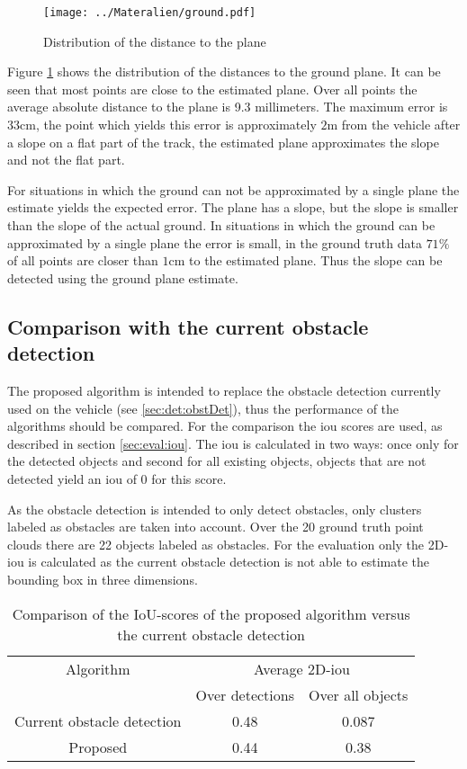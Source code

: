 \begin{figure}[h!]
    \centering
    \texttt{[image: ../Materalien/ground.pdf]}
    \caption{Distribution of the distance to the plane}
    \label{fig:eval:groundDist}
\end{figure}

Figure \ref{fig:eval:groundDist} shows the distribution of the distances to the ground plane. 
It can be seen that most points are close to the estimated plane. Over all points the average absolute distance to the plane is 9.3 millimeters. The maximum error is 33cm, the point which yields this error is approximately $2\si{\m}$ from the vehicle after a slope on a flat part of the track, the estimated plane approximates the slope and not the flat part.

For situations in which the ground can not be approximated by a single plane the estimate yields the expected error. The plane has a slope, but the slope is smaller than the slope of the actual ground.
In situations in which the ground can be approximated by a single plane the error is small, in the ground truth data $71\%$ of all points are closer than $1\si{\cm}$ to the estimated plane. Thus the slope can be detected using the ground plane estimate. 

\subsection{Comparison with the current obstacle detection}
The proposed algorithm is intended to replace the obstacle detection currently used on the vehicle (see \ref{sec:det:obstDet}), thus the performance of the algorithms should be compared.
For the comparison the \ac{iou} scores are used, as described in section \ref{sec:eval:iou}.
The \ac{iou} is calculated in two ways: once only for the detected objects and second for all existing objects, objects that are not detected yield an \ac{iou} of $0$ for this score.

As the obstacle detection is intended to only detect obstacles, only clusters labeled as obstacles are taken into account. Over the 20 ground truth point clouds there are 22 objects labeled as obstacles. For the evaluation only the 2D-\ac{iou} is calculated as the current obstacle detection is not able to estimate the bounding box in three dimensions.

\begin{table}[h!]
    \centering
    \begin{tabular}{c|cc}
        \toprule
        Algorithm & \multicolumn{2}{c}{Average 2D-\ac{iou}} \\
         & Over detections & Over all objects \\
        \midrule
        Current obstacle detection & 0.48 & 0.087 \\
        Proposed & 0.44 & 0.38 \\
        \bottomrule
    \end{tabular}
    \caption{Comparison of the IoU-scores of the proposed algorithm versus the current obstacle detection}
    \label{tab:eval:compOld}
\end{table}

